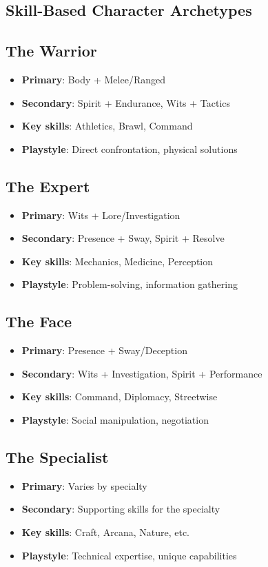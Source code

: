 \begin{multicols}{2}
\section{Skill-Based Character Archetypes}

\subsection*{The Warrior}
\begin{itemize}
\item \textbf{Primary}: Body + Melee/Ranged
\item \textbf{Secondary}: Spirit + Endurance, Wits + Tactics
\item \textbf{Key skills}: Athletics, Brawl, Command
\item \textbf{Playstyle}: Direct confrontation, physical solutions
\end{itemize}

\subsection*{The Expert}
\begin{itemize}
\item \textbf{Primary}: Wits + Lore/Investigation
\item \textbf{Secondary}: Presence + Sway, Spirit + Resolve
\item \textbf{Key skills}: Mechanics, Medicine, Perception
\item \textbf{Playstyle}: Problem-solving, information gathering
\end{itemize}

\subsection*{The Face}
\begin{itemize}
\item \textbf{Primary}: Presence + Sway/Deception
\item \textbf{Secondary}: Wits + Investigation, Spirit + Performance
\item \textbf{Key skills}: Command, Diplomacy, Streetwise
\item \textbf{Playstyle}: Social manipulation, negotiation
\end{itemize}

\subsection*{The Specialist}
\begin{itemize}
\item \textbf{Primary}: Varies by specialty
\item \textbf{Secondary}: Supporting skills for the specialty
\item \textbf{Key skills}: Craft, Arcana, Nature, etc.
\item \textbf{Playstyle}: Technical expertise, unique capabilities
\end{itemize}


\end{multicols}
